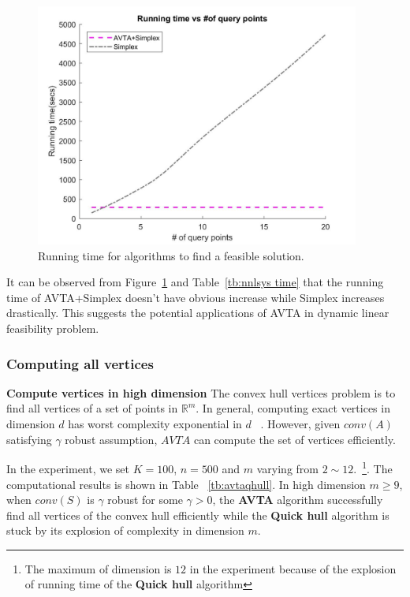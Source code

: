 \documentclass[]{article}
\begin{document}
	\begin{figure}[!h]
		\centering
		\scalebox{0.5}
		{
			\begin{minipage}[b]{0.95\linewidth}
				\centering
				\includegraphics[width=0.95\textwidth]{nnsys.jpg}
				
			\end{minipage}%
		}
		\caption{Running time for algorithms to find a feasible solution.}
		\label{fig:nnlsys-time}
	\end{figure}
	\noindent It can be observed from Figure~\ref{fig:nnlsys-time} and Table~\ref{tb:nnlsys time} that the running time of AVTA+Simplex doesn't have obvious increase while Simplex increases drastically. This suggests the potential applications of AVTA in dynamic linear feasibility problem.
	
	\subsubsection{Computing all vertices}
	\noindent\textbf{Compute vertices in high dimension} The convex hull vertices problem is to find all vertices of a set of points in $\mathbb{R}^m$. In general, computing exact vertices in dimension $d$ has worst complexity exponential in $d$  ~\cite{chazelle1993optimal}. However, given $conv(A)$ satisfying $\gamma$ robust assumption, $AVTA$ can compute the set of vertices efficiently. 
	
	\noindent
	In the experiment, we set $K=100$, $n=500$ and $m$ varying from $2 \sim 12$.~\footnote{ The maximum of dimension is $12$ in the experiment because of the explosion of running time of the \textbf{Quick hull} algorithm}.
	\noindent
	The computational results is shown in Table ~\ref{tb:avtaqhull}.  In high dimension $m \geq 9$, when $conv(S)$ is $\gamma$ robust for some $\gamma >0$, the \textbf{AVTA} algorithm successfully find all vertices of the convex hull efficiently while the \textbf{Quick hull} algorithm is stuck by its explosion of complexity in dimension $m$. 
	
\end{document}
